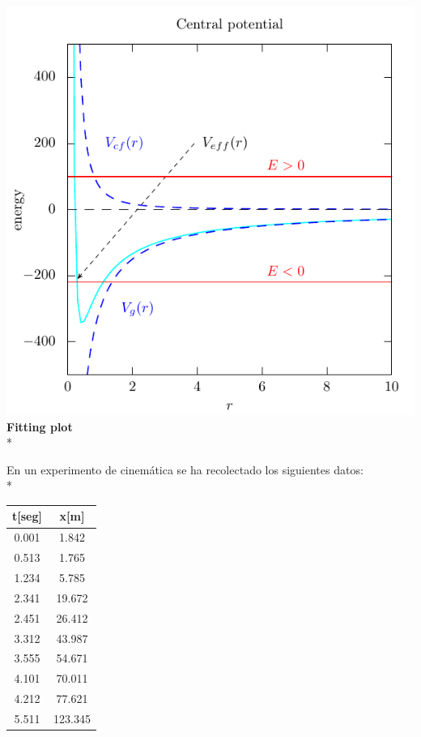 \documentclass[11.5pt,a4paper]{article}
\begin{document}
\includegraphics[scale=0.75]{ejercicio2.pdf}\\

\textbf{Fitting plot}\\*

En un experimento de cinemática se ha recolectado los siguientes datos:\\*

\begin{center}
\begin{tabular}{|c|c|}
\hline 
{\bf t[seg]} & {\bf x[m]} \\ 
\hline
0.001 & 1.842 \\ 
\hline 
0.513 & 1.765 \\ 
\hline 
1.234 & 5.785 \\ 
\hline 
2.341 & 19.672 \\ 
\hline 
2.451 & 26.412 \\ 
\hline 
3.312 & 43.987\\
\hline
3.555 & 54.671\\
\hline
4.101 & 70.011\\
\hline
4.212 & 77.621\\
\hline
5.511 & 123.345\\
\hline
\end{tabular} 
\end{center}
\end{document}

